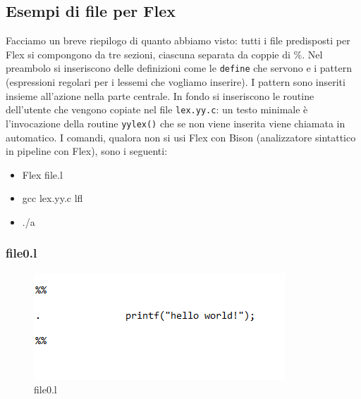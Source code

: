 \documentclass[class=book, crop=false, oneside, 12pt]{standalone}
\begin{document}
\subsection{Esempi di file per Flex}
Facciamo un breve riepilogo di quanto abbiamo visto: tutti i file predisposti per Flex si compongono da tre sezioni, ciascuna separata da coppie di \%. Nel preambolo si inseriscono delle definizioni come le \texttt{define} che servono e i pattern (espressioni regolari per i lessemi che vogliamo inserire). I pattern sono inseriti insieme all'azione nella parte centrale. In fondo si inseriscono le routine dell'utente che vengono copiate nel file \texttt{lex.yy.c}: un testo minimale è l'invocazione della routine \texttt{yylex()} che se non viene inserita viene chiamata in automatico. I comandi, qualora non si usi Flex con Bison (analizzatore sintattico in pipeline con Flex), sono i seguenti:
\begin{itemize}
    \item Flex file.l
    \item gcc lex.yy.c lfl
    \item ./a
\end{itemize}

\subsubsection{file0.l}
        
\begin{figure}[h]
    \centering
    \includegraphics[width=.7\textwidth,keepaspectratio]{file0.l.png}
    \caption{file0.l}
    \label{file0.l}
\end{figure}
\end{document}
